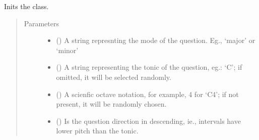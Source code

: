 \documentclass[letterpaper,10pt,english]{sphinxmanual}
\begin{document}
\begin{fulllineitems}
\begin{fulllineitems}
\label{\detokenize{birdears:birdears.questionbase.QuestionBase.__init__}}
\sphinxAtStartPar
Inits the class.
\begin{quote}\begin{description}
\item[{Parameters}] \leavevmode\begin{itemize}
\item {} 
\sphinxAtStartPar
{} () \textendash{} A string represnting the mode of the question.
Eg., ‘major’ or ‘minor’

\item {} 
\sphinxAtStartPar
{} () \textendash{} A string representing the tonic of the
question, eg.: ‘C’; if omitted, it will be selected
randomly.

\item {} 
\sphinxAtStartPar
{} () \textendash{} A scienfic octave notation, for example,
4 for ‘C4’; if not present, it will be randomly chosen.

\item {} 
\sphinxAtStartPar
{} () \textendash{} Is the question direction in descending,
ie., intervals have lower pitch than the tonic.


\end{itemize}
\end{description}
\end{quote}
\end{fulllineitems}
\end{fulllineitems}
\end{document}
